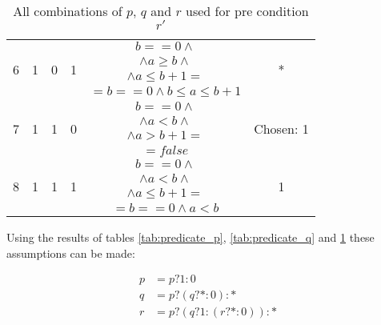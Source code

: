 \begin{table}
\begin{tabular}{ | c | c | c | c | c | c | }
    \multirow{4}{*}{6} & \multirow{4}{*}{1} & \multirow{4}{*}{0} & \multirow{4}{*}{1} & $b == 0 \land $ & \multirow{4}{*}{*} \\
    & & & & $\land a \ge b \land$ & \\
    & & & & $\land a \le b + 1 =$ & \\
    & & & & $= b == 0 \land b \le a \le b + 1$ & \\ \hline

    \multirow{4}{*}{7} & \multirow{4}{*}{1} & \multirow{4}{*}{1} & \multirow{4}{*}{0} & $b == 0 \land $ & \multirow{4}{*}{Chosen: 1} \\
    & & & & $\land a < b \land$ & \\
    & & & & $\land a > b + 1 =$ & \\
    & & & & $= false$ & \\ \hline

    \multirow{4}{*}{8} & \multirow{4}{*}{1} & \multirow{4}{*}{1} & \multirow{4}{*}{1} & $b == 0 \land $ & \multirow{4}{*}{1} \\
    & & & & $\land a < b \land$ & \\
    & & & & $\land a \le b + 1 =$ & \\
    & & & & $= b == 0 \land a < b$ & \\ \hline
  \end{tabular}
  \caption{All combinations of $p$, $q$ and $r$ used for pre condition $r'$}
  \label{tab:predicate_r}
\end{table}

Using the results of tables \ref{tab:predicate_p}, \ref{tab:predicate_q} and \ref{tab:predicate_r} these assumptions can be made:

\begin{equation}
\begin{array}{rl}
p &= p ? 1 : 0\\
q &= p ? (q ? * : 0) : *\\
r &= p ? (q ? 1 : (r ? * : 0)) : *\\
\end{array}
\end{equation}
